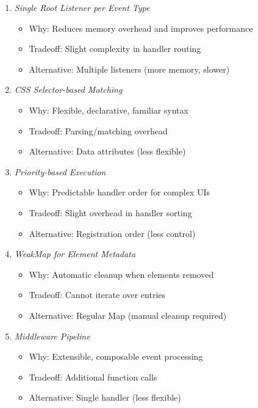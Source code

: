 \documentclass[11pt]{article}
\begin{document}
\begin{enumerate}
\item \emph{Single Root Listener per Event Type}

\begin{itemize}
\item Why: Reduces memory overhead and improves performance
\item Tradeoff: Slight complexity in handler routing
\item Alternative: Multiple listeners (more memory, slower)
\end{itemize}

\item \emph{CSS Selector-based Matching}

\begin{itemize}
\item Why: Flexible, declarative, familiar syntax
\item Tradeoff: Parsing/matching overhead
\item Alternative: Data attributes (less flexible)
\end{itemize}

\item \emph{Priority-based Execution}

\begin{itemize}
\item Why: Predictable handler order for complex UIs
\item Tradeoff: Slight overhead in handler sorting
\item Alternative: Registration order (less control)
\end{itemize}

\item \emph{WeakMap for Element Metadata}

\begin{itemize}
\item Why: Automatic cleanup when elements removed
\item Tradeoff: Cannot iterate over entries
\item Alternative: Regular Map (manual cleanup required)
\end{itemize}

\item \emph{Middleware Pipeline}
\begin{itemize}
\item Why: Extensible, composable event processing
\item Tradeoff: Additional function calls
\item Alternative: Single handler (less flexible)
\end{itemize}
\end{enumerate}
\end{document}
